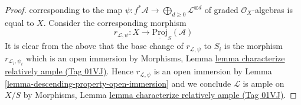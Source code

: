 \documentclass{amsart}
\theoremstyle{plain}
\theoremstyle{definition}
\theoremstyle{remark}
\numberwithin{equation}{subsection}
\begin{document}
\begin{proof}
corresponding to the map
$\psi : f^*\mathcal{A} \to \bigoplus_{d \geq 0} \mathcal{L}^{\otimes d}$
of graded $\mathcal{O}_X$-algebras
is equal to $X$. Consider the corresponding morphism
$$
r_{\mathcal{L}, \psi} : X \longrightarrow \underline{\text{Proj}}_S(\mathcal{A})
$$
It is clear from the above that the base change of
$r_{\mathcal{L}, \psi}$ to $S_i$ is the morphism
$r_{\mathcal{L}_i, \psi_i}$ which is an open immersion by
Morphisms, Lemma \href{https://stacks.math.columbia.edu/tag/01VJ}{lemma characterize relatively ample (Tag 01VJ)}.
Hence $r_{\mathcal{L}, \psi}$ is an open immersion
by Lemma \ref{lemma-descending-property-open-immersion}
and we conclude $\mathcal{L}$ is ample on $X/S$ by
Morphisms, Lemma \href{https://stacks.math.columbia.edu/tag/01VJ}{lemma characterize relatively ample (Tag 01VJ)}.
\end{proof}
\end{document}

